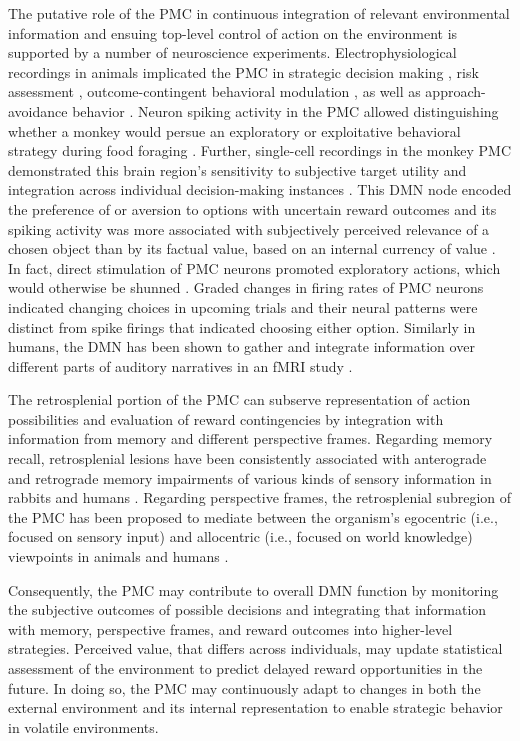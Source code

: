 \documentclass[10pt,letterpaper]{article}
\begin{document}
The putative role of the PMC in continuous integration of
relevant environmental information
and ensuing top-level control of action on the environment is supported
by a number of neuroscience experiments.
Electrophysiological recordings in animals implicated the PMC in
strategic decision making \citep{pearson2009neurons},
risk assessment \citep{mccoy2005risk},
outcome-contingent behavioral modulation \citep{hayden2009electrophysiological},
as well as approach-avoidance behavior
\citep{vann2009does}.
Neuron spiking activity in the PMC allowed distinguishing
whether a monkey would persue an exploratory or exploitative
behavioral strategy during food foraging \citep{pearson2009neurons}.
Further, single-cell recordings in the monkey PMC
demonstrated this brain region's sensitivity to
subjective target utility \citep{mccoy2005risk} and integration
across individual decision-making instances \citep{pearson2009neurons}.
This DMN node encoded the
preference of or aversion to options with uncertain reward outcomes
and its spiking activity was more associated with
subjectively perceived relevance of a chosen object
than by its factual value,
based on an internal currency of value \citep{mccoy2005risk}.
In fact, direct stimulation of PMC neurons
promoted exploratory actions,
which would otherwise be shunned \citep{hayden2008stim}.
Graded changes in firing rates of PMC neurons
indicated changing choices in upcoming trials and their neural patterns were
distinct from spike firings that indicated choosing either option.
Similarly in humans,
the DMN has been shown to gather and integrate information
over different parts of auditory narratives in an fMRI study
\citep{simony2016dynamic}.


The retrosplenial portion of the PMC can subserve
representation of action possibilities
and evaluation of reward contingencies by integration with
information from memory and different perspective frames.
Regarding memory recall, retrosplenial lesions have been
consistently associated with anterograde and retrograde memory impairments
of various kinds of sensory information
in rabbits and humans
\citep{vann2009does}.
Regarding perspective frames, the retrosplenial subregion of the PMC has been
proposed to mediate between the organism's egocentric
(i.e., focused on sensory input) and
allocentric (i.e., focused on world knowledge) viewpoints
in animals and humans
\citep{epstein2008parahippocampal, burgess2008spatial, valiquette2007different}.



Consequently, the PMC may contribute to overall DMN function
by monitoring the subjective outcomes
of possible decisions and integrating that information
with memory, perspective frames, and
reward outcomes into higher-level strategies.
Perceived value, that differs across individuals, may update
statistical assessment of the environment
to predict delayed reward opportunities in the future.
In doing so, the PMC may continuously adapt to changes
in both the external environment and its internal representation
to enable strategic behavior in volatile environments.
\end{document}

